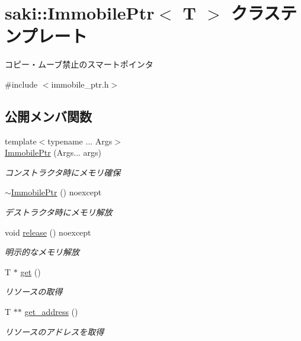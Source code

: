 \hypertarget{classsaki_1_1_immobile_ptr}{}\section{saki\+:\+:Immobile\+Ptr$<$ T $>$ クラステンプレート}
\label{classsaki_1_1_immobile_ptr}


コピー・ムーブ禁止のスマートポインタ  




{\ttfamily \#include $<$immobile\+\_\+ptr.\+h$>$}

\subsection*{公開メンバ関数}
\begin{DoxyCompactItemize}
\item 
{\footnotesize template$<$typename ... Args$>$ }\\\mbox{\hyperlink{classsaki_1_1_immobile_ptr_a5b990c72b4222f49b160f4ed5d0c77f9}{Immobile\+Ptr}} (Args... args)
\begin{DoxyCompactList}\small\item\em コンストラクタ時にメモリ確保 \end{DoxyCompactList}\item 
\mbox{\hyperlink{classsaki_1_1_immobile_ptr_ac51507648866a294082a9f38796ca5e4}{$\sim$\+Immobile\+Ptr}} () noexcept
\begin{DoxyCompactList}\small\item\em デストラクタ時にメモリ解放 \end{DoxyCompactList}\item 
void \mbox{\hyperlink{classsaki_1_1_immobile_ptr_a669b89e9c884f703f9dafc1257d694bf}{release}} () noexcept
\begin{DoxyCompactList}\small\item\em 明示的なメモリ解放 \end{DoxyCompactList}\item 
T $\ast$ \mbox{\hyperlink{classsaki_1_1_immobile_ptr_afdaa7016460af66e4e375f064e232720}{get}} ()
\begin{DoxyCompactList}\small\item\em リソースの取得 \end{DoxyCompactList}\item 
T $\ast$$\ast$ \mbox{\hyperlink{classsaki_1_1_immobile_ptr_a8c0dc38fed7ef4e56321909f42f9ed5f}{get\+\_\+address}} ()
\begin{DoxyCompactList}\small\item\em リソースのアドレスを取得 \end{DoxyCompactList}\item 
$$
\end{DoxyCompactItemize}
